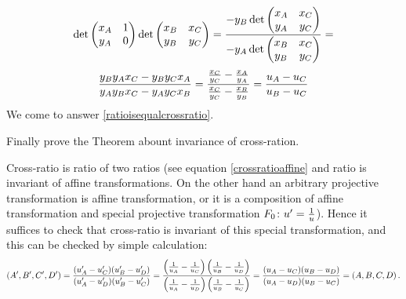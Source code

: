 \documentclass[12pt]{article}
\numberwithin{equation}{section}
\begin{document}
{$${               \det
            \begin{pmatrix}
                     x_A &  1\cr
                     y_A &  0\cr
            \end{pmatrix}
                 \det
            \begin{pmatrix}
                     x_B & x_C\cr
                     y_B & y_C\cr
            \end{pmatrix}
              }
  =   {
               - y_B \det
            \begin{pmatrix}
                     x_A & x_C\cr
                     y_A & y_C\cr
            \end{pmatrix}
                     \over
                - y_A\det
            \begin{pmatrix}
                     x_B & x_C\cr
                     y_B & y_C\cr
            \end{pmatrix}
              }=
         $$     
     \begin{equation*}
                    {
                y_By_A x_C-y_By_Cx_A
                     \over
                 y_Ay_B x_C-y_Ay_Cx_B
              }=
                     {
                {x_C\over y_C}-{x_A\over y_A}
                     \over
                  {x_C\over y_C}-{x_B\over y_B}
              }={u_A-u_C\over u_B-u_C}
     \end{equation*}  
We come to answer \eqref{ratioisequalcrossratio}.



}






{\footnotesize Finally prove the Theorem abount invariance of 
cross-ration.

  Cross-ratio is ratio of two ratios (see equation
 \eqref{crossratioaffine} and ratio is 
invariant of affine transformations.
  On the other hand an arbitrary projective transformation is
affine transformation, or it is a composition of affine transformation
and special projective transformation $F_0\colon u'={1\over u}$).
Hence it suffices to check  that cross-ratio is invariant 
of this special
transformation, and this can be checked by simple calculation:
        $$
(A',B',C',D')=
{
(u_A'-u_C')
(u_B'-u_D')
\over 
(u_A'-u_D')
(u_B'-u_C')
}=
   {
\left({1\over u_A}-{1\over u_C}\right)   
\left({1\over u_B}-{1\over u_D}\right)   
    \over
\left({1\over u_A}-{1\over u_D}\right)   
\left({1\over u_B}-{1\over u_C}\right)   
}=
{
(u_A-u_C)
(u_B-u_D)
\over 
(u_A-u_D)
(u_B-u_C)
}=(A,B,C,D)\,.
        $$


}
\end{document}
